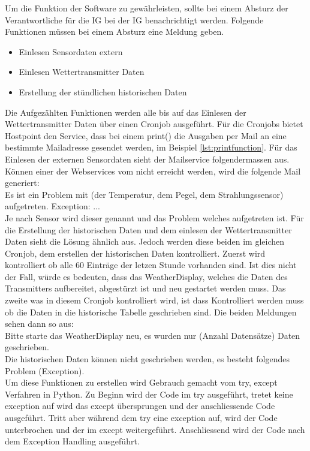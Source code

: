 Um die Funktion der Software zu gewährleisten, sollte bei einem Absturz der Verantwortliche für die IG bei der IG benachrichtigt werden. Folgende Funktionen müssen bei einem Absturz eine Meldung geben.
\begin{itemize}
\item Einlesen Sensordaten extern
\item Einlesen Wettertransmitter Daten
\item Erstellung der stündlichen historischen Daten
\end{itemize}
Die Aufgezählten Funktionen werden alle bis auf das Einlesen der Wettertransmitter Daten über einen Cronjob ausgeführt. Für die Cronjobs bietet Hostpoint den Service, dass bei einem print() die Ausgaben per Mail an eine bestimmte Mailadresse gesendet werden, im Beispiel \ref{lst:printfunction}. Für das Einlesen der externen Sensordaten sieht der Mailservice folgendermassen aus. Können einer der Webservices vom  nicht erreicht werden, wird die folgende Mail generiert:\\
Es ist ein Problem mit (der Temperatur, dem Pegel, dem Strahlungssensor) aufgetreten. Exception: ...\\
Je nach Sensor wird dieser genannt und das Problem welches aufgetreten ist. Für die Erstellung der historischen Daten und dem einlesen der Wettertransmitter Daten sieht die Lösung ähnlich aus. Jedoch werden diese beiden im gleichen Cronjob, dem erstellen der historischen Daten kontrolliert. Zuerst wird kontrolliert ob alle 60 Einträge der letzen Stunde vorhanden sind. Ist dies nicht der Fall, würde es bedeuten, dass das WeatherDisplay, welches die Daten des Transmitters aufbereitet, abgestürzt ist und neu gestartet werden muss. Das zweite was in diesem Cronjob kontrolliert wird, ist dass Kontrolliert werden muss ob die Daten in die historische Tabelle geschrieben sind. Die beiden Meldungen sehen dann so aus:\\
Bitte starte das WeatherDisplay neu, es wurden nur (Anzahl Datensätze) Daten geschrieben.\\
Die historischen Daten können nicht geschrieben werden, es besteht folgendes Problem (Exception).\\

Um diese Funktionen zu erstellen wird Gebrauch gemacht vom try, except Verfahren in Python. Zu Beginn wird der Code im try ausgeführt, tretet keine exception auf wird das except übersprungen und der anschliessende Code ausgeführt. Tritt aber während dem try eine exception auf, wird der Code unterbrochen und der im except weitergeführt. Anschliessend wird der Code nach dem Exception Handling ausgeführt.\cite{ThePythonTutorial8.ErrorsAndExceptions:Python}

